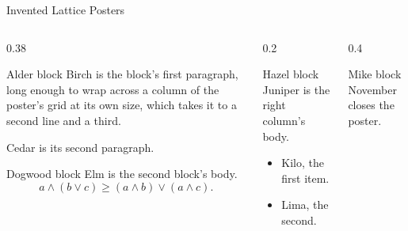 \documentclass{ltface}
\begin{document}
\begin{frame}{Invented Lattice Posters}
\begin{columns}[T]
\begin{column}{0.38\textwidth}
\begin{block}{Alder block}
Birch is the block's first paragraph, long enough to wrap across a column of the poster's grid
at its own size, which takes it to a second line and a third.

Cedar is its second paragraph.
\end{block}
\begin{block}{Dogwood block}
Elm is the second block's body.
\[ a \wedge (b \vee c) \ge (a \wedge b) \vee (a \wedge c). \]
\end{block}
\end{column}
\begin{column}{0.2\textwidth}
\begin{block}{Hazel block}
Juniper is the right column's body.
\begin{itemize}
\item Kilo, the first item.
\item Lima, the second.
\end{itemize}
\end{block}
\end{column}
\begin{column}{0.4\textwidth}
\begin{alertblock}{Mike block}
November closes the poster.
\end{alertblock}
\end{column}
\end{columns}
\end{frame}
\end{document}
